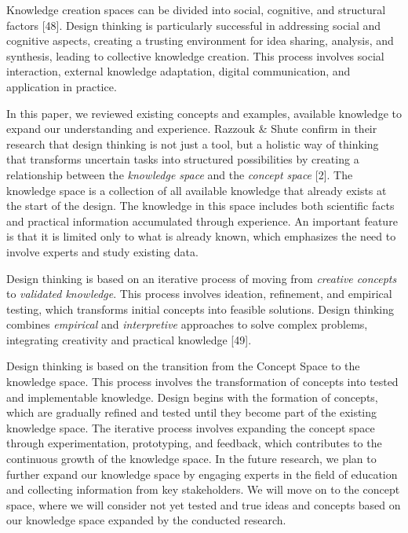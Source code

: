 Knowledge creation spaces can be divided into social, cognitive, and
structural factors {[}48{]}. Design thinking is particularly successful
in addressing social and cognitive aspects, creating a trusting
environment for idea sharing, analysis, and synthesis, leading to
collective knowledge creation. This process involves social interaction,
external knowledge adaptation, digital communication, and application in
practice.

In this paper, we reviewed existing concepts and examples, available
knowledge to expand our understanding and experience. Razzouk \& Shute
confirm in their research that design thinking is not just a tool, but a
holistic way of thinking that transforms uncertain tasks into structured
possibilities by creating a relationship between the \emph{knowledge
space} and the \emph{concept space} {[}2{]}. The knowledge space is a
collection of all available knowledge that already exists at the start
of the design. The knowledge in this space includes both scientific
facts and practical information accumulated through experience. An
important feature is that it is limited only to what is already known,
which emphasizes the need to involve experts and study existing data.

Design thinking is based on an iterative process of moving from
\emph{creative concepts} to \emph{validated knowledge}. This process
involves ideation, refinement, and empirical testing, which transforms
initial concepts into feasible solutions. Design thinking combines
\emph{empirical} and \emph{interpretive} approaches to solve complex
problems, integrating creativity and practical knowledge {[}49{]}.

Design thinking is based on the transition from the Concept Space to the
knowledge space. This process involves the transformation of concepts
into tested and implementable knowledge. Design begins with the
formation of concepts, which are gradually refined and tested until they
become part of the existing knowledge space. The iterative process
involves expanding the concept space through experimentation,
prototyping, and feedback, which contributes to the continuous growth of
the knowledge space. In the future research, we plan to further expand
our knowledge space by engaging experts in the field of education and
collecting information from key stakeholders. We will move on to the
concept space, where we will consider not yet tested and true ideas and
concepts based on our knowledge space expanded by the conducted
research.

